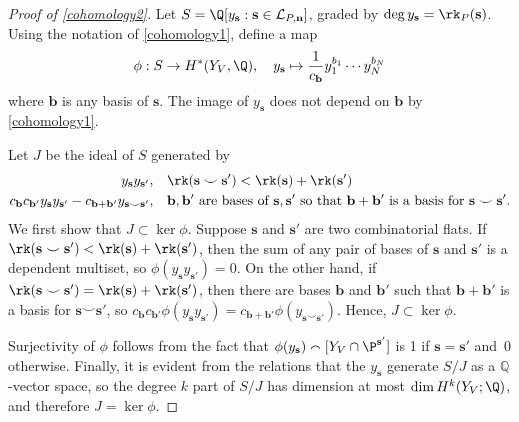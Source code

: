 \begin{proof}[Proof of \cref{cohomology2}]
  Let $S = \Q[y_{\mathbf s} : \text{$\mathbf s \in \mathcal L_{P, \mathbf n}$}]$, graded by $\deg y_{\mathbf s} = \rk_P(\mathbf s)$.
  Using the notation of \cref{cohomology1}, define a map
  \[
    \phi: S \to H^*(Y_V, \Q), \quad y_{\mathbf s} \mapsto \frac{1}{c_{\mathbf b}} y_1^{b_1} \cdots y_N^{b_N}
  \]
  where $\mathbf b$ is any basis of $\mathbf s$. The image of $y_{\mathbf s}$ does not depend on $\mathbf b$ by \cref{cohomology1}.

  Let $J$ be the ideal of $S$ generated by
  \begin{align*}
    y_{\mathbf s} y_{\mathbf s'}, &\quad \rk(\mathbf s \smile \mathbf s') < \rk(\mathbf s) + \rk(\mathbf s') \\
    c_{\mathbf b} c_{\mathbf b'} y_{\mathbf s} y_{\mathbf s'} - c_{\mathbf b + \mathbf b'} y_{\mathbf s \smile \mathbf s'}, & \quad \text{$\mathbf b, \mathbf b'$ are bases of $\mathbf s, \mathbf s'$ so that $\mathbf b + \mathbf b'$ is a basis for $\mathbf s \smile \mathbf s'$.}
  \end{align*}
  We first show that $J \subset \ker \phi$. Suppose $\mathbf s$ and $\mathbf s'$ are two combinatorial flats.
  If \mbox{$\rk(\mathbf{s}\smile\mathbf{s}') < \rk(\mathbf s) + \rk(\mathbf s')$}, then the sum of any pair of bases of $\mathbf s$ and $\mathbf s'$ is a dependent multiset, so $\phi(y_{\mathbf s} y_{\mathbf s'}) = 0$.
  On the other hand, if $\rk(\mathbf s \smile \mathbf s') = \rk(\mathbf s) + \rk(\mathbf s')$, then there are bases $\mathbf b$ and $\mathbf b'$ such that $\mathbf b + \mathbf b'$ is a basis for $\mathbf s \smile \mathbf s'$, so $c_{\mathbf b} c_{\mathbf b'} \phi(y_{\mathbf s} y_{\mathbf s'}) = c_{\mathbf b + \mathbf b'} \phi(y_{\mathbf s \smile \mathbf s'})$.
  Hence, $J \subset\ker \phi$.

  Surjectivity of $\phi$ follows from the fact that $\phi(y_{\mathbf s}) \smallfrown [Y_V \cap \P^{\mathbf s'}]$ is 1 if $\mathbf s = \mathbf s'$ and~0 otherwise. Finally, it is evident from the relations that the $y_{\mathbf{s}}$ generate $S/J$ as a $\mathbb{Q}$-vector space, so the degree $k$ part of $S/J$ has dimension at most $\dim H^k(Y_V; \Q)$, and therefore $J =\ker \phi$.
\end{proof}

